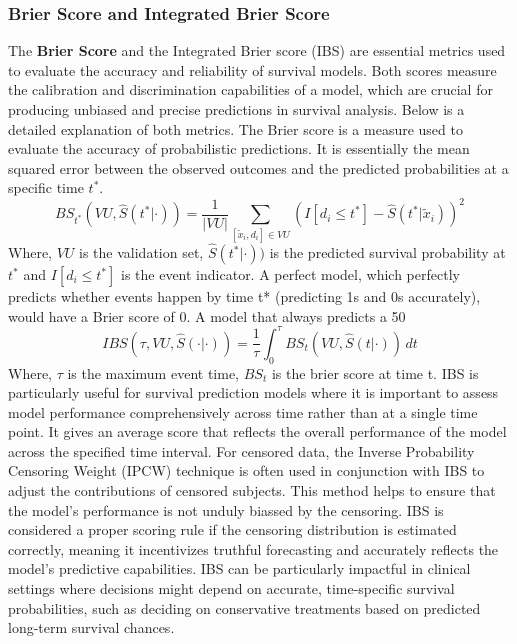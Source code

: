 \subsubsection{Brier Score and Integrated Brier Score}
The \textbf{Brier Score} and the Integrated Brier score (IBS) are essential metrics used to evaluate the accuracy and reliability of survival models. Both scores measure the calibration and discrimination capabilities of a model, which are crucial for producing unbiased and precise predictions in survival analysis. Below is a detailed explanation of both metrics. The Brier score is a measure used to evaluate the accuracy of probabilistic predictions. It is essentially the mean squared error between the observed outcomes and the predicted probabilities at a specific time \(t^{*}\).
\[BS_{t^*}(VU, \hat{S}(t^* | \cdot)) = \frac{1}{|VU|} \sum_{[\tilde{x}_i, d_i] \in VU} (I[d_i \leq t^*] - \hat{S}(t^* | \tilde{x}_i))^2\]
\noindent Where, \(VU\) is the validation set, \(\hat{S}(t^* | \cdot))\) is the predicted survival probability at \(t^{*}\) and \(I[d_i \leq t^*]\) is the event indicator.
\noindent A perfect model, which perfectly predicts whether events happen by time t* (predicting 1s and 0s accurately), would have a Brier score of 0. A model that always predicts a 50%
\[IBS(\tau, VU, \hat{S}(\cdot | \cdot)) = \frac{1}{\tau} \int_0^{\tau} BS_t(VU, \hat{S}(t | \cdot)) \, dt\]
\noindent Where, \(\tau\) is the maximum event time, \(BS_{t}\) is the brier score at time t.
\noindent IBS is particularly useful for survival prediction models where it is important to assess model performance comprehensively across time rather than at a single time point. It gives an average score that reflects the overall performance of the model across the specified time interval. For censored data, the Inverse Probability Censoring Weight (IPCW) technique is often used in conjunction with IBS to adjust the contributions of censored subjects. This method helps to ensure that the model's performance is not unduly biassed by the censoring. IBS is considered a proper scoring rule if the censoring distribution is estimated correctly, meaning it incentivizes truthful forecasting and accurately reflects the model's predictive capabilities. IBS can be particularly impactful in clinical settings where decisions might depend on accurate, time-specific survival probabilities, such as deciding on conservative treatments based on predicted long-term survival chances.

